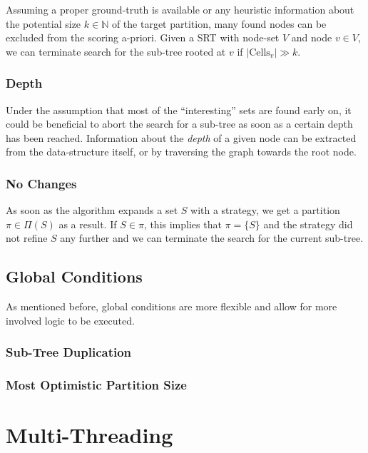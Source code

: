 				Assuming a proper ground-truth is available or any heuristic information about the potential size $k \in \mathbb{N}$ of the target partition, many found nodes can be excluded from the scoring a-priori. 
				Given a \ac{SRT} with node-set $V$ and node $v \in V$, we can terminate search for the sub-tree rooted at $v$ if $| \mathrm{Cells}_v | \gg k$.
				
			
			\subsubsection{Depth}
			
				Under the assumption that most of the \enquote{interesting} sets are found early on, it could be beneficial to abort the search for a sub-tree as soon as a certain depth has been reached.
				Information about the \textit{depth} of a given node can be extracted from the data-structure itself, or by traversing the graph towards the root node.
				
			\subsubsection{No Changes}
			
				As soon as the algorithm expands a set $S$ with a strategy, we get a partition $\pi \in \Pi(S)$ as a result.
				If $S \in \pi$, this implies that $\pi = \{ S \}$ and the strategy did not refine $S$ any further and we can terminate the search for the current sub-tree.
		
		\subsection{Global Conditions}
		
			As mentioned before, global conditions are more flexible and allow for more involved logic to be executed.
			
			\subsubsection{Sub-Tree Duplication}
			
			\subsubsection{Most Optimistic Partition Size}
	
			\clearpage
	
	\section{Multi-Threading}
	\label{chap:impl:multi}

